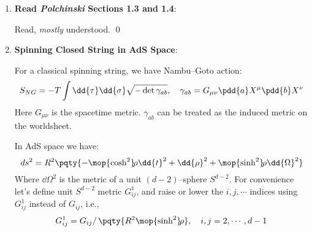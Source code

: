 \documentclass[a4paper,10pt]{article}
\newcommand{\oppower}[2]{\mop{{#1}^{#2}}\!}
\newcommand{\sqsinh}{\oppower{\sinh}{2}}
\newcommand{\sqcosh}{\oppower{\cosh}{2}}
\begin{document}
\maketitle
\pagestyle{headings}
\thispagestyle{empty}

	\begin{enumerate}
	\item \textbf{Read \textit{Polchinski} Sections 1.3 and 1.4}: 
	
	Read, \textit{mostly} understood. \qed
	
	\item \textbf{Spinning Closed String in AdS Space}:
	
	For a classical spinning string, we have Nambu--Goto action:
	\begin{equation}
		S_{NG}
		= -T \int \dd{\tau} \dd{\sigma}
			\sqrt{-\det \gamma_{ab}},\quad
		\gamma_{ab} = G_{\mu\nu}
			\pdd{a}X^\mu \pdd{b}X^\nu
	\end{equation}
	Here $G_{\mu\nu}$ is the spacetime metric. $\gamma_{ab}$ can be treated as the induced metric on the worldsheet. 
	
	In AdS space we have:
	\begin{equation}
		ds^2
		= R^2\pqty{
			- \sqcosh\rho \dd{t}^2
			+ \dd{\rho}^2
			+ \sqsinh\rho \dd{\Omega}^2
		}
	\end{equation}
	Where $\dd{\Omega}^2$ is the metric of a unit $(d-2)$--sphere $S^{d-2}$. For convenience let's define unit $S^{d-2}$ metric $G^1_{ij}$, and raise or lower the $i,j,\cdots$ indices using $G^1_{ij}$ instead of $G_{ij}$, i.e.,
	\begin{equation}
		G^1_{ij} = G_{ij} /\,\pqty{
			R^2 \sqsinh\rho
		},\quad
		i,j = 2,\cdots,d-1
	\end{equation}
	

\end{enumerate}
\end{document}
